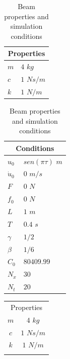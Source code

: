 \documentclass{ws-m3as}
\begin{document}
\begin{table}[htb]
\centering
\caption{Beam properties and simulation conditions}
\label{tabla:propiedadesD2}
\begin{tabular}{|l|l|}
\hline
\multicolumn{2}{|c|}{Properties} \\ \hline
$m$ & $4$ $kg$ \\
$c$ & $1$ $N s/m$\\
$k$ & $1$ $N/m$\\
\hline
\end{tabular}
\begin{tabular}{|l|l|}
\hline
\multicolumn{2}{|c|}{Conditions} \\ \hline
$u_0$ &  $sen(\pi \tau)$ $m$ \\
$\dot{u}_0$ & $0$ $m/s$\\
$F$ & $0$ $N$\\
$f_0$ & $0$ $N$\\
$L$ & $1$ $m$\\
$T$ & $0.4$ $s$\\
$\gamma$ & $1/2$\\
$\beta$ & $1/6$ \\
$C_0$ & $80409.99$ \\
$N_x$ & $30$ \\
$N_t$ & $20$ \\
\hline
\end{tabular}
\end{table}

\begin{table}[ht]
{\begin{tabular}{@{}cc@{}} \toprule
\multicolumn{2}{c}{Properties} \\
\colrule
$m$ & $4$ $kg$ \\
$c$ & $1$ $N s/m$\\
$k$ & $1$ $N/m$\\ \botrule
\end{tabular}}
\end{table}
\end{document}
